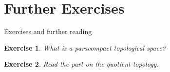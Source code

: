 \documentclass[10pt]{beamer}
\newtheorem{exercise}{Exercise}
\begin{document}
\section{Further Exercises}

\begin{frame}{Exercises and further reading}
	\begin{exercise}
		What is a \emph{paracompact} topological space?
	\end{exercise}
	\begin{exercise}
		Read the part on the \emph{quotient topology}.
	\end{exercise}
\end{frame}
\end{document}
